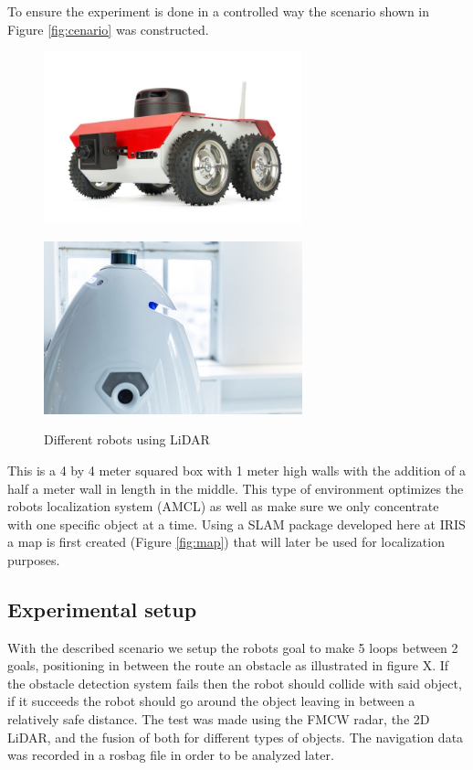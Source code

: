 To ensure the experiment is done in a controlled way the scenario shown in Figure \ref{fig:cenario} was constructed. 
\begin{figure}[ht!] 
    \begin{minipage}[b]{.49\linewidth}
        \includegraphics[height=5cm,width=\linewidth]{imgs/chapter2/robot1.jpg}
        \label{fig:cenario}
    \end{minipage}
    \begin{minipage}[b]{.49\linewidth}
        \includegraphics[height=5cm,width=\linewidth]{imgs/chapter2/robot2.jpg}
        \label{fig:map}
    \end{minipage}
    \caption{Different robots using \ac{LiDAR}}
    \label{fig:setup}
\end{figure}
This is a 4 by 4 meter squared box with 1 meter high walls with the addition of a half a meter wall in length in the middle. This type of environment optimizes the robots localization system (\ac{AMCL}) as well as make sure we only concentrate with one specific object at a time. Using a \ac{SLAM} package developed here at \ac{IRIS} a map is first created (Figure \ref{fig:map}) that will later be used for localization purposes.
\subsection{Experimental setup}
With the described scenario we setup the robots goal to make 5 loops between 2 goals, positioning in between the route an obstacle as illustrated in  figure X. If the obstacle detection system fails then the robot should collide with said object, if it succeeds the robot should go around the object leaving in between a relatively safe distance. The test was made using the \ac{FMCW} radar, the 2D \ac{LiDAR}, and the fusion of both for different types of objects. The  navigation data was recorded in a rosbag file in order to be analyzed later.

